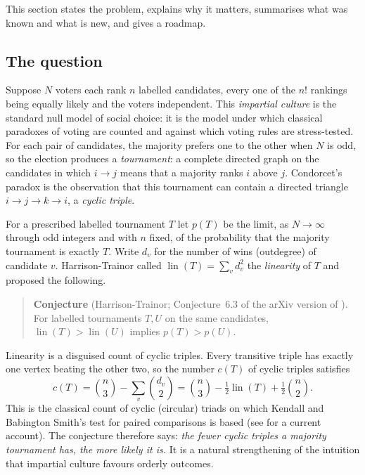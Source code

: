 \documentclass[11pt,a4paper]{article}
\theoremstyle{definition}
\DeclareMathOperator{\lin}{lin}
\begin{document}
This section states the problem, explains why it matters, summarises what was known and what is new, and gives a roadmap.

\subsection{The question}

Suppose $N$ voters each rank $n$ labelled candidates, every one of the $n!$ rankings being equally likely and the voters independent. This \emph{impartial culture} is the standard null model of social choice: it is the model under which classical paradoxes of voting are counted and against which voting rules are stress-tested. For each pair of candidates, the majority prefers one to the other when $N$ is odd, so the election produces a \emph{tournament}: a complete directed graph on the candidates in which $i\to j$ means that a majority ranks $i$ above $j$. Condorcet's paradox is the observation that this tournament can contain a directed triangle $i\to j\to k\to i$, a \emph{cyclic triple}.

For a prescribed labelled tournament $T$ let $p(T)$ be the limit, as $N\to\infty$ through odd integers and with $n$ fixed, of the probability that the majority tournament is exactly $T$. Write $d_v$ for the number of wins (outdegree) of candidate $v$. Harrison-Trainor \cite{harrison} called $\lin(T)=\sum_v d_v^2$ the \emph{linearity} of $T$ and proposed the following.

\begin{quote}
\textbf{Conjecture} (Harrison-Trainor; Conjecture~6.3 of the arXiv version of \cite{harrison}). For labelled tournaments $T,U$ on the same candidates, $\lin(T)>\lin(U)$ implies $p(T)>p(U)$.
\end{quote}

Linearity is a disguised count of cyclic triples. Every transitive triple has exactly one vertex beating the other two, so the number $c(T)$ of cyclic triples satisfies
\begin{equation}
 c(T)=\binom{n}{3}-\sum_v\binom{d_v}{2}
 =\binom{n}{3}-\tfrac12\lin(T)+\tfrac12\binom{n}{2}.
 \label{eq:triangles}
\end{equation}
This is the classical count of cyclic (circular) triads on which Kendall and Babington Smith's test for paired comparisons is based (see \cite[Section~4.1.1]{SD2026} for a current account). The conjecture therefore says: \emph{the fewer cyclic triples a majority tournament has, the more likely it is.} It is a natural strengthening of the intuition that impartial culture favours orderly outcomes.
\end{document}
